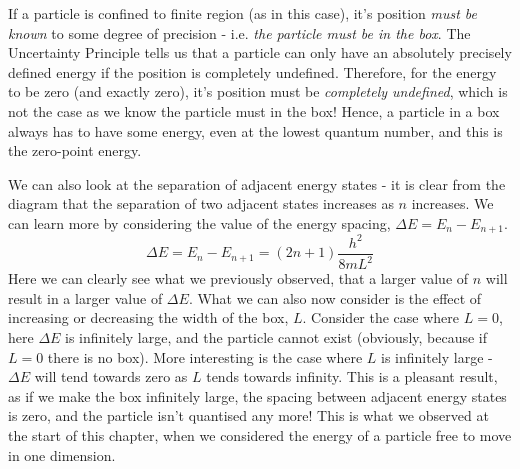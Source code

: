\documentclass{memoir}[11pt,oneside,a4paper,openany]
\begin{document}
If a particle is confined to finite region (as in this case), it's position \emph{must be known} to some degree of precision - i.e. \emph{the particle must be in the box}. The Uncertainty Principle tells us that a particle can only have an absolutely precisely defined energy if the position is completely undefined. Therefore, for the energy to be zero (and exactly zero), it's position must be \emph{completely undefined}, which is not the case as we know the particle must in the box! Hence, a particle in a box always has to have some energy, even at the lowest quantum number, and this is the zero-point energy.

We can also look at the separation of adjacent energy states - it is clear from the diagram that the separation of two adjacent states increases as $n$ increases. We can learn more by considering the value of the energy spacing, $\Delta E = E_n - E_{n+1}$.
\begin{equation}
	\Delta E  = E_n - E_{n+1} = (2n+1)\frac{h^2}{8mL^2}
\end{equation}
Here we can clearly see what we previously observed, that a larger value of $n$ will result in a larger value of $\Delta E$. What we can also now consider is the effect of increasing or decreasing the width of the box, $L$. Consider the case where $L = 0$, here $\Delta E$ is infinitely large, and the particle cannot exist (obviously, because if $L=0$ there is no box). More interesting is the case where $L$ is infinitely large - $\Delta E$ will tend towards zero as $L$ tends towards infinity. This is a pleasant result, as if we make the box infinitely large, the spacing between adjacent energy states is zero, and the particle isn't quantised any more! This is what we observed at the start of this chapter, when we considered the energy of a particle free to move in one dimension.
\end{document}
